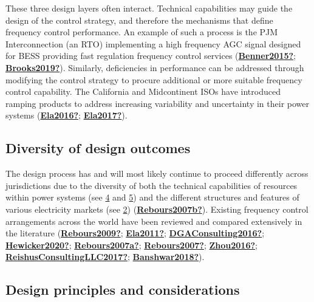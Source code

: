 \documentclass[12pt,a4paper,]{report}
\begin{document}
These three design layers often interact. Technical capabilities may
guide the design of the control strategy, and therefore the mechanisms
that define frequency control performance. An example of such a process
is the PJM Interconnection (an RTO) implementing a high frequency AGC
signal designed for BESS providing fast regulation frequency control
services (\protect\hyperlink{ref-Benner2015}{\textbf{Benner2015?}};
\protect\hyperlink{ref-Brooks2019}{\textbf{Brooks2019?}}). Similarly,
deficiencies in performance can be addressed through modifying the
control strategy to procure additional or more suitable frequency
control capability. The California and Midcontinent ISOs have introduced
ramping products to address increasing variability and uncertainty in
their power systems (\protect\hyperlink{ref-Ela2016}{\textbf{Ela2016?}};
\protect\hyperlink{ref-Ela2017}{\textbf{Ela2017?}}).

\hypertarget{diversity-of-design-outcomes}{%
\subsection{Diversity of design
outcomes}\label{diversity-of-design-outcomes}}

The design process has and will most likely continue to proceed
differently across jurisdictions due to the diversity of both the
technical capabilities of resources within power systems (see
\protect\hyperlink{sec:freq_dev_control}{4} and
\protect\hyperlink{sec:ibr_freq}{5}) and the different structures and
features of various electricity markets (see
\protect\hyperlink{sec:elec_markets}{2})
(\protect\hyperlink{ref-Rebours2007b}{\textbf{Rebours2007b?}}). Existing
frequency control arrangements across the world have been reviewed and
compared extensively in the literature
(\protect\hyperlink{ref-Rebours2009}{\textbf{Rebours2009?}};
\protect\hyperlink{ref-Ela2011}{\textbf{Ela2011?}};
\protect\hyperlink{ref-DGAConsulting2016}{\textbf{DGAConsulting2016?}};
\protect\hyperlink{ref-Hewicker2020}{\textbf{Hewicker2020?}};
\protect\hyperlink{ref-Rebours2007a}{\textbf{Rebours2007a?}};
\protect\hyperlink{ref-Rebours2007}{\textbf{Rebours2007?}};
\protect\hyperlink{ref-Zhou2016}{\textbf{Zhou2016?}};
\protect\hyperlink{ref-ReishusConsultingLLC2017}{\textbf{ReishusConsultingLLC2017?}};
\protect\hyperlink{ref-Banshwar2018}{\textbf{Banshwar2018?}}).

\hypertarget{design-principles-and-considerations}{%
\subsection{Design principles and
considerations}\label{design-principles-and-considerations}}
\end{document}
